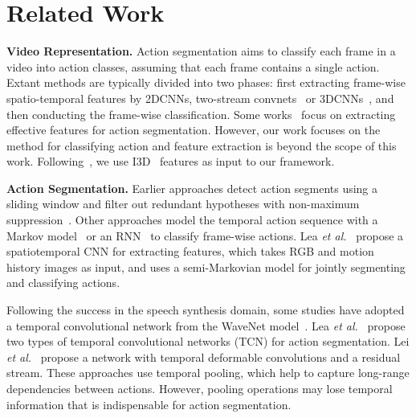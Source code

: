\documentclass[10pt,twocolumn,letterpaper]{article}
\begin{document}
\section{Related Work}
\textbf{Video Representation.}
Action segmentation aims to classify each frame in a video into action classes, assuming that each frame contains a single action.
Extant methods are typically divided into two phases:
first extracting frame-wise spatio-temporal features by 2DCNNs\cite{tsm}, two-stream convnets~\cite{SimonyanNIPS2014,FeichtenhoferCVPR2016} or 3DCNNs~\cite{CarreiraCVPR2017,s3d,slowfast,channel-separated,x3d}, and then conducting the frame-wise classification.
Some works~\cite{ensemble_cnns,markov2,bi-lstm2,Mac_2019_ICCV} focus on extracting effective features for action segmentation.
However, our work focuses on the method for classifying action and feature extraction is beyond the scope of this work.
Following~\cite{mstcn}, we use I3D~\cite{CarreiraCVPR2017} features as input to our framework.

\textbf{Action Segmentation.}
Earlier approaches detect action segments using a sliding window and filter out redundant hypotheses with non-maximum suppression~\cite{slidingwindow1,slidingwindow2}.
Other approaches model the temporal action sequence with a Markov model~\cite{markov1,markov3} or an RNN~\cite{bi-lstm2} to classify frame-wise actions.
Lea \textit{et al.}~\cite{markov2} propose a spatiotemporal CNN for extracting features, which takes RGB and motion history images as input,
and uses a semi-Markovian model for jointly segmenting and classifying actions.

Following the success in the speech synthesis domain, some studies have adopted a temporal convolutional network from the WaveNet model~\cite{wavenet}.
Lea \textit{et al.}~\cite{tcn} propose two types of temporal convolutional networks (TCN) for action segmentation.
Lei \textit{et al.}~\cite{deform} propose a network with temporal deformable convolutions and a residual stream.
These approaches use temporal pooling, which help to capture long-range dependencies between actions.
However, pooling operations may lose temporal information that is indispensable for action segmentation.
\end{document}
